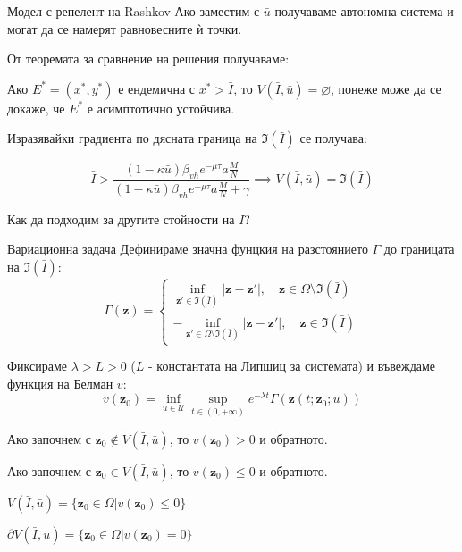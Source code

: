 \begin{frame}[t]{Модел с репелент на Rashkov}
  Ако заместим с $\bar{u}$ получаваме автономна система и могат да се намерят равновесните ѝ точки.

  От теоремата за сравнение на решения получаваме:
  \begin{proposition}
    Ако $E^* = (x^*, y^*)$ е ендемична с $x^* > \bar{I}$, то $V(\bar{I}, \bar{u}) = \varnothing$, понеже може да се докаже, че $E^*$ е асимптотично устойчива.
  \end{proposition}

  Изразявайки градиента по дясната граница на $\mathfrak{I}(\bar{I})$ се получава:
  \begin{proposition}
    \begin{equation*}
      \bar{I} > \frac{(1-\kappa \bar{u}) \beta_{vh} e^{-\mu \tau} a \frac{M}{N}}{(1-\kappa \bar{u}) \beta_{vh} e^{-\mu \tau} a \frac{M}{N} + \gamma} \implies V(\bar{I}, \bar{u}) = \mathfrak{I}(\bar{I})
    \end{equation*}
  \end{proposition}
  Как да подходим за другите стойности на $\bar{I}$?
\end{frame}

\begin{frame}[t]{Вариационна задача}
  Дефинираме значна фунцкия на разстоянието $\Gamma$ до границата на $\mathfrak{I}(\bar{I})$:
  \begin{equation}
    \Gamma(\boldsymbol{z}) =
    \begin{cases}
      \inf_{\boldsymbol{z}' \in \mathfrak{I}(\bar{I})} |\boldsymbol{z}-\boldsymbol{z}'|, \quad \boldsymbol{z} \in \Omega \setminus \mathfrak{I}(\bar{I}) \\
      -\inf_{\boldsymbol{z}' \in \Omega \setminus \mathfrak{I}(\bar{I})} |\boldsymbol{z}-\boldsymbol{z}'|, \quad \boldsymbol{z} \in \mathfrak{I}(\bar{I})
    \end{cases}
  \end{equation}

  Фиксираме $\lambda>L>0$ ($L$ - константата на Липшиц за системата) и въвеждаме функция на Белман $v$:
  \begin{equation}
    v(\boldsymbol{z}_0) = \inf_{u \in \mathscr{U}} \sup_{t \in (0, +\infty)} e^{-\lambda t} \Gamma(\boldsymbol{z}(t; \boldsymbol{z}_0; u))
  \end{equation}

  Ако започнем с $\boldsymbol{z}_0 \notin V(\bar{I}, \bar{u})$, то $v(\boldsymbol{z}_0) > 0$ и обратното.

  Ако започнем с $\boldsymbol{z}_0 \in V(\bar{I}, \bar{u})$, то $v(\boldsymbol{z}_0) \leq 0$ и обратното.

  $V(\bar{I}, \bar{u}) = \{\boldsymbol{z}_0 \in \Omega \vert v(\boldsymbol{z}_0) \leq 0\}$

  $\partial V(\bar{I}, \bar{u}) = \{\boldsymbol{z}_0 \in \Omega \vert v(\boldsymbol{z}_0) = 0\}$
\end{frame}

